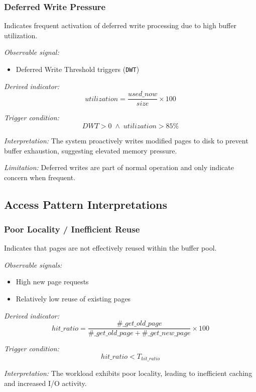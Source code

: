 \subsubsection{Deferred Write Pressure}

Indicates frequent activation of deferred write processing due to high buffer utilization.

\textit{Observable signal:}
\begin{itemize}
    \item Deferred Write Threshold triggers (\texttt{DWT})
\end{itemize}

\textit{Derived indicator:}
\[
utilization = \frac{used\_now}{size} \times 100
\]

\textit{Trigger condition:}
\[
DWT > 0 \;\land\; utilization > 85\%
\]

\textit{Interpretation:}  
The system proactively writes modified pages to disk to prevent buffer exhaustion, suggesting elevated memory pressure.

\textit{Limitation:}  
Deferred writes are part of normal operation and only indicate concern when frequent.


\subsection{Access Pattern Interpretations}

\subsubsection{Poor Locality / Inefficient Reuse}


Indicates that pages are not effectively reused within the buffer pool.

\textit{Observable signals:}
\begin{itemize}
    \item High new page requests
    \item Relatively low reuse of existing pages
\end{itemize}

\textit{Derived indicator:}
\[
hit\_ratio = \frac{\#\_get\_old\_page}{\#\_get\_old\_page + \#\_get\_new\_page} \times 100
\]

\textit{Trigger condition:}
\[
hit\_ratio < T_{hit\_ratio}
\]

\textit{Interpretation:}  
The workload exhibits poor locality, leading to inefficient caching and increased I/O activity.

